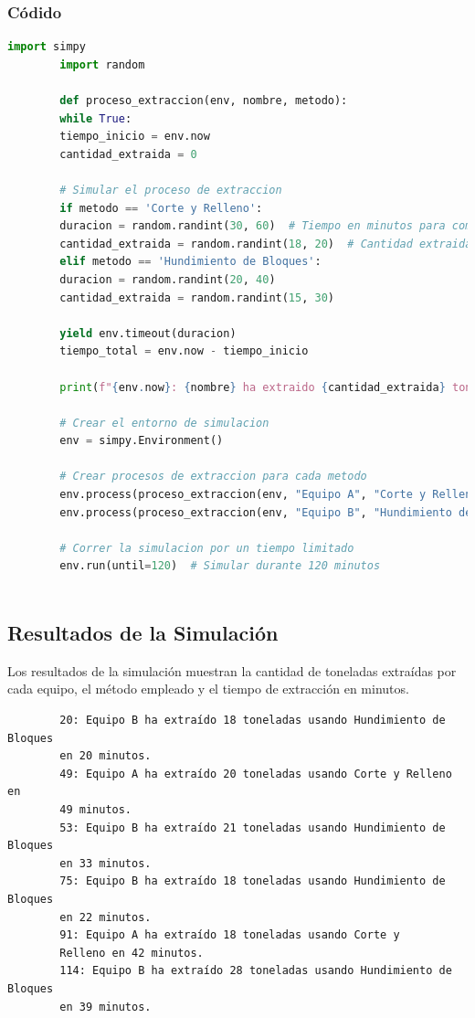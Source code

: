 \documentclass[a5paper]{article}
\begin{document}
	\subsubsection*{Códido}
	\begin{lstlisting}[language=Python, caption=Simulación de Procesos de Extracción, frame=single]
		import simpy
		import random
		
		def proceso_extraccion(env, nombre, metodo):
		while True:
		tiempo_inicio = env.now
		cantidad_extraida = 0
		
		# Simular el proceso de extraccion
		if metodo == 'Corte y Relleno':
		duracion = random.randint(30, 60)  # Tiempo en minutos para completar la extraccion
		cantidad_extraida = random.randint(18, 20)  # Cantidad extraida en toneladas
		elif metodo == 'Hundimiento de Bloques':
		duracion = random.randint(20, 40)
		cantidad_extraida = random.randint(15, 30)
		
		yield env.timeout(duracion)
		tiempo_total = env.now - tiempo_inicio
		
		print(f"{env.now}: {nombre} ha extraido {cantidad_extraida} toneladas usando {metodo} en {tiempo_total} minutos.")
		
		# Crear el entorno de simulacion
		env = simpy.Environment()
		
		# Crear procesos de extraccion para cada metodo
		env.process(proceso_extraccion(env, "Equipo A", "Corte y Relleno"))
		env.process(proceso_extraccion(env, "Equipo B", "Hundimiento de Bloques"))
		
		# Correr la simulacion por un tiempo limitado
		env.run(until=120)  # Simular durante 120 minutos
		
	\end{lstlisting}
	
	\subsection*{Resultados de la Simulación}
	
	Los resultados de la simulación muestran la cantidad de toneladas extraídas por cada equipo, el método empleado y el tiempo de extracción en minutos.
	
	\begin{verbatim}
		20: Equipo B ha extraído 18 toneladas usando Hundimiento de Bloques
		en 20 minutos.
		49: Equipo A ha extraído 20 toneladas usando Corte y Relleno en
		49 minutos.
		53: Equipo B ha extraído 21 toneladas usando Hundimiento de Bloques
		en 33 minutos.
		75: Equipo B ha extraído 18 toneladas usando Hundimiento de Bloques 
		en 22 minutos.
		91: Equipo A ha extraído 18 toneladas usando Corte y 
		Relleno en 42 minutos.
		114: Equipo B ha extraído 28 toneladas usando Hundimiento de Bloques
		en 39 minutos.
	\end{verbatim}
	
\end{document}
